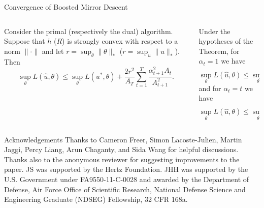 \documentclass[final]{beamer}
\begin{document}
\begin{frame}{}
\begin{columns}
\begin{column}{0.48\linewidth}
\begin{block}{\large Convergence of Boosted Mirror Descent}
\begin{columns}[t]
\begin{column}{0.45\linewidth}
\begin{theorem}
Consider the primal (respectively the dual) algorithm. Suppose that $h$ ($R$) is strongly convex with respect to a norm $\|\cdot\|$ 
and let $r = \sup_{\theta} \|\theta\|_{*}$ ($r = \sup_{u} \|u\|_{*}$). Then
\[ \sup_{\theta} L(\hat{u}, \theta) \leq \sup_{\theta} L(u^*, \theta) + \frac{2r^2}{A_T} \sum_{t=1}^T \frac{\alpha_{t+1}^2A_t}{A_{t+1}^2}. \]
\end{theorem}
\end{column}
\begin{column}{0.45\linewidth}
\begin{corollary} 
Under the hypotheses of the Theorem, for $\alpha_{t} = 1$ we have
\[ \sup_{\theta} L(\hat{u}, \theta) \leq \sup_{\theta} L(u^*, \theta) + \frac{2r^2 (\log (T) + 1)}{T}. \]
and for $\alpha_t = t$ we have
\[ \sup_{\theta} L(\hat{u}, \theta) \leq \sup_{\theta} L(u^*, \theta) + \frac{8r^2}{T}. \]
\end{corollary}
\end{column}
\end{columns}
\end{block}

%
%
%
%
%

\begin{block}{\small Acknowledgements}
{\footnotesize Thanks to Cameron Freer, Simon Lacoste-Julien, Martin Jaggi, Percy Liang, Arun Chaganty, and Sida Wang 
for helpful discussions. Thanks also to the anonymous reviewer for suggesting improvements 
to the paper. JS was supported by the Hertz Foundation. JHH was supported by the U.S. Government under FA9550-11-C-0028 and awarded by the Department of Defense, Air Force Office of Scientific Research, National Defense Science and Engineering Graduate (NDSEG) Fellowship, 32 CFR 168a.}
\end{block}


\end{column}
\end{columns}
\end{frame}
\end{document}
